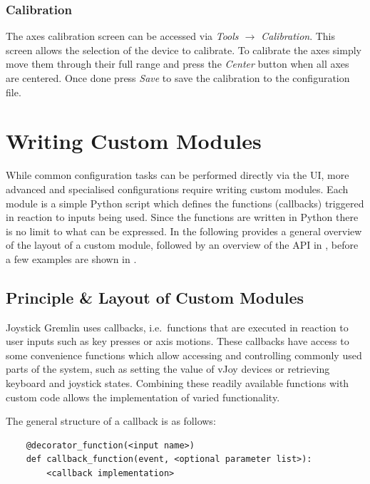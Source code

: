 \documentclass[a4, 10pt]{article}
\begin{document}
\subsubsection{Calibration}

The axes calibration screen can be accessed via \emph{Tools
$\rightarrow$ Calibration}. This screen allows the selection of the
device to calibrate. To calibrate the axes simply move them through
their full range and press the \emph{Center} button when all axes are
centered. Once done press \emph{Save} to save the calibration to the
configuration file.



\section{Writing Custom Modules}
\label{sec:custom_modules}

While common configuration tasks can be performed directly via the UI,
more advanced and specialised configurations require writing custom
modules. Each module is a simple Python script which defines the
functions (callbacks) triggered in reaction to inputs being used. Since
the functions are written in Python there is no limit to what can be
expressed. In the following  provides a general
overview of the layout of a custom module, followed by an overview of
the API in , before a few examples are shown in
.


\subsection{Principle \& Layout of Custom Modules}
\label{sec:cm_principles}

Joystick Gremlin uses callbacks, i.e.\ functions that are executed in
reaction to user inputs such as key presses or axis motions. These
callbacks have access to some convenience functions which allow
accessing and controlling commonly used parts of the system, such as
setting the value of vJoy devices or retrieving keyboard and joystick
states. Combining these readily available functions with custom code
allows the implementation of varied functionality.

The general structure of a callback is as follows:
\begin{verbatim}
    @decorator_function(<input name>)
    def callback_function(event, <optional parameter list>):
        <callback implementation>
\end{verbatim}
\end{document}
